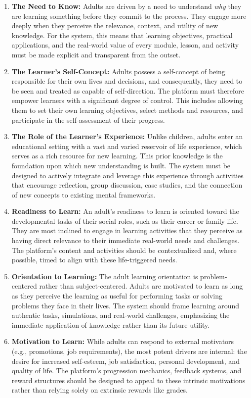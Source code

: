 \documentclass{article}
\begin{document}
\begin{enumerate}
    \item \textbf{The Need to Know:} Adults are driven by a need to understand \textit{why} they are learning something before they commit to the process.\cite{2, 8, 9} They engage more deeply when they perceive the relevance, context, and utility of new knowledge.\cite{8, 9} For the system, this means that learning objectives, practical applications, and the real-world value of every module, lesson, and activity must be made explicit and transparent from the outset.
    \item \textbf{The Learner's Self-Concept:} Adults possess a self-concept of being responsible for their own lives and decisions, and consequently, they need to be seen and treated as capable of self-direction.\cite{2, 8, 10} The platform must therefore empower learners with a significant degree of control. This includes allowing them to set their own learning objectives, select methods and resources, and participate in the self-assessment of their progress.\cite{7, 8, 11}
    \item \textbf{The Role of the Learner's Experience:} Unlike children, adults enter an educational setting with a vast and varied reservoir of life experience, which serves as a rich resource for new learning.\cite{1, 3, 7} This prior knowledge is the foundation upon which new understanding is built.\cite{8, 9} The system must be designed to actively integrate and leverage this experience through activities that encourage reflection, group discussion, case studies, and the connection of new concepts to existing mental frameworks.\cite{8, 9}
    \item \textbf{Readiness to Learn:} An adult's readiness to learn is oriented toward the developmental tasks of their social roles, such as their career or family life.\cite{2, 8, 10} They are most inclined to engage in learning activities that they perceive as having direct relevance to their immediate real-world needs and challenges.\cite{8, 9} The platform's content and activities should be contextualized and, where possible, timed to align with these life-triggered needs.
    \item \textbf{Orientation to Learning:} The adult learning orientation is problem-centered rather than subject-centered.\cite{2, 4, 5} Adults are motivated to learn as long as they perceive the learning as useful for performing tasks or solving problems they face in their lives.\cite{3, 7, 8, 10} The system should frame learning around authentic tasks, simulations, and real-world challenges, emphasizing the immediate application of knowledge rather than its future utility.\cite{7, 8}
    \item \textbf{Motivation to Learn:} While adults can respond to external motivators (e.g., promotions, job requirements), the most potent drivers are internal: the desire for increased self-esteem, job satisfaction, personal development, and quality of life.\cite{2, 5, 8, 9, 11} The platform's progression mechanics, feedback systems, and reward structures should be designed to appeal to these intrinsic motivations rather than relying solely on extrinsic rewards like grades.
\end{enumerate}
\end{document}
